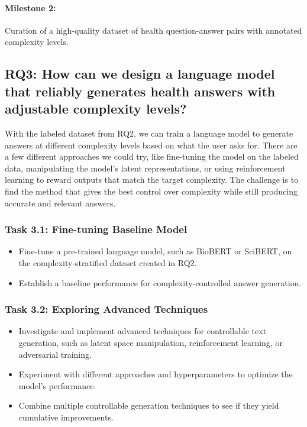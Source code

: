 \paragraph{Milestone 2:} Curation of a high-quality dataset of health question-answer pairs with annotated complexity levels.


\subsection*{RQ3: How can we design a language model that reliably generates health answers with adjustable complexity levels?}

With the labeled dataset from RQ2, we can train a language model to generate answers at different complexity levels based on what the user asks for. 
There are a few different approaches we could try, like fine-tuning the model on the labeled data, manipulating the model's latent representations, or using reinforcement learning to reward outputs that match the target complexity. 
The challenge is to find the method that gives the best control over complexity while still producing accurate and relevant answers.

\subsubsection*{Task 3.1: Fine-tuning Baseline Model}

\begin{itemize}
    \item Fine-tune a pre-trained language model, such as BioBERT or SciBERT, on the complexity-stratified dataset created in RQ2.
    \item Establish a baseline performance for complexity-controlled answer generation.
\end{itemize}

\subsubsection*{Task 3.2: Exploring Advanced Techniques}

\begin{itemize}
    \item Investigate and implement advanced techniques for controllable text generation, such as latent space manipulation, reinforcement learning, or adversarial training.
    \item Experiment with different approaches and hyperparameters to optimize the model's performance.
    \item Combine multiple controllable generation techniques to see if they yield cumulative improvements.
\end{itemize}

